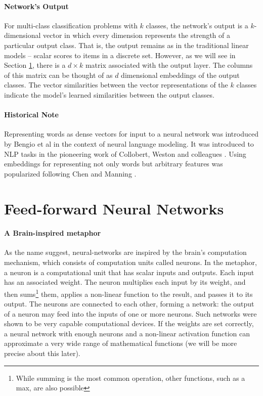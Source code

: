 \documentclass[jair,twoside,11pt,theapa]{article}
\newcommand{\ygcomment}[1]{\textbf{[TODO: #1]}}
\renewcommand{\ygcomment}[1]{}
\renewcommand{\shortcite}[0]{\citeyear}
\begin{document}
{\paragraph{Network's Output} For multi-class classification problems with $k$
classes, the
network's output is a $k$-dimensional vector in which every dimension represents
the strength of a particular output class. That is, the output remains as in the
traditional linear models -- scalar scores to items in a discrete set.  However,
as we will see in Section
\ref{sec:ff}, there is a $d \times k$ matrix associated with the
output layer. The columns of this matrix can be thought of as $d$ dimensional
embeddings of the output classes.  The vector similarities between the vector
representations of the $k$ classes indicate the model's learned similarities between the
output classes.

\paragraph{Historical Note}  Representing words as dense vectors for input to a
neural network was introduced by Bengio et al \cite{bengio2003neural} in the
context of neural language modeling.  It was introduced to NLP tasks in the
pioneering work of Collobert, Weston and colleagues
\shortcite{collobert2008unified,collobert2011natural}.  Using embeddings for
representing not only words but arbitrary features was popularized following Chen and Manning \shortcite{chen2014fast}.

\clearpage
\section{Feed-forward Neural Networks}
\label{sec:ff}
\ygcomment{linear vs nonlinear, the xor example\ldots}

\paragraph{A Brain-inspired metaphor} As the name suggest, neural-networks are
inspired by the brain's computation mechanism, which consists of computation
units called neurons. In the metaphor, a neuron is a computational unit that has
scalar inputs and outputs.  Each input has an associated weight. The neuron
multiplies each input by its weight, and then sums\footnote{While summing is the
most common operation, other functions, such as a max, are also possible} them,
applies a non-linear function to the result, and passes it to its output. 
The neurons are connected to each other, forming a network:  the output of a
neuron may feed into the inputs of one or more neurons.  Such networks were shown to
be very capable computational devices.  If the weights are set correctly, a neural network
with enough neurons and a non-linear activation function can approximate a very wide range of mathematical functions (we will be more precise
about this later).

}
\end{document}
